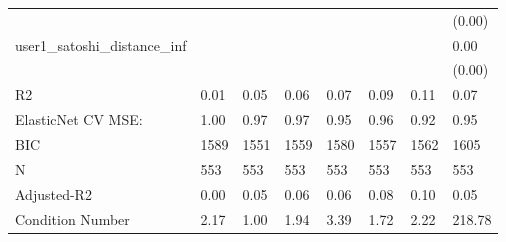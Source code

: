 \begin{table}
\begin{center}
\begin{tabular}{llllllll}
                                               &          &            &         &         &          &                    & (0.00)   \\
user1_satoshi_distance_inf                     &          &            &         &         &          &                    & 0.00     \\
                                               &          &            &         &         &          &                    & (0.00)   \\
R2                                             & 0.01     & 0.05       & 0.06    & 0.07    & 0.09     & 0.11               & 0.07     \\
ElasticNet CV MSE:                             & 1.00     & 0.97       & 0.97    & 0.95    & 0.96     & 0.92               & 0.95     \\
BIC                                            & 1589     & 1551       & 1559    & 1580    & 1557     & 1562               & 1605     \\
N                                              & 553      & 553        & 553     & 553     & 553      & 553                & 553      \\
Adjusted-R2                                    & 0.00     & 0.05       & 0.06    & 0.06    & 0.08     & 0.10               & 0.05     \\
Condition Number                               & 2.17     & 1.00       & 1.94    & 3.39    & 1.72     & 2.22               & 218.78   \\
\hline
\end{tabular}
\end{center}
\end{table}